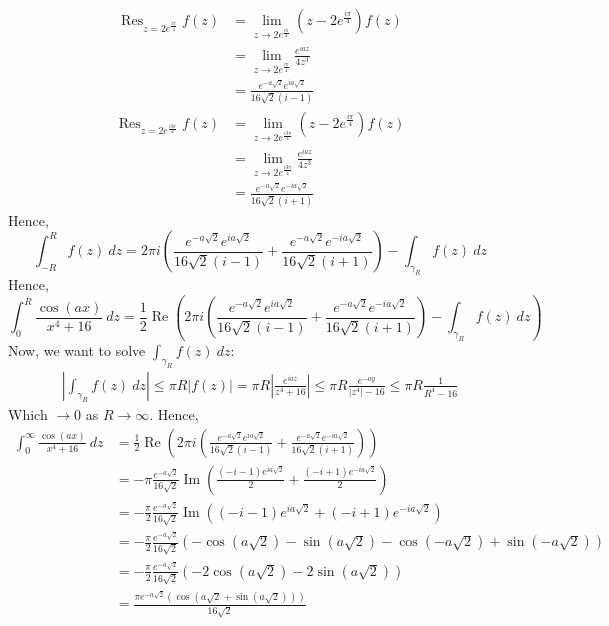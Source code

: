 \documentclass{article}
\newcommand{\abs}[1]{\left| #1 \right|}
\newcommand{\paren}[1]{\left(#1\right)}
\DeclareMathOperator{\real}{Re}
\DeclareMathOperator{\imm}{Im}
\DeclareMathOperator{\Res}{Res}
\begin{document}
\begin{enumerate}
\begin{align*}
\Res_{z=2e^{\frac{i\pi}{4}}} f(z) &= \lim_{z \to 2e^{\frac{i\pi}{4}}} (z-2e^{\frac{i\pi}{4}})f(z) \\
    &= \lim_{z \to 2e^{\frac{i\pi}{4}}} \frac{e^{iaz}}{4z^3} \\
    &= \frac{e^{-a\sqrt{2}}e^{ia\sqrt{2}}}{16\sqrt{2}(i-1)}
\end{align*}
\begin{align*}
\Res_{z=2e^{\frac{i3\pi}{4}}} f(z) &= \lim_{z \to 2e^{\frac{i3\pi}{4}}} (z-2e^{\frac{i\pi}{4}})f(z) \\
    &= \lim_{z \to 2e^{\frac{i3\pi}{4}}} \frac{e^{iaz}}{4z^3} \\
    &= \frac{e^{-a\sqrt{2}}e^{-ia\sqrt{2}}}{16\sqrt{2}(i+1)}
\end{align*}
Hence,
\[
\int_{-R}^R f(z)\ dz = 2\pi i\paren{\frac{e^{-a\sqrt{2}}e^{ia\sqrt{2}}}{16\sqrt{2}(i-1)} + \frac{e^{-a\sqrt{2}}e^{-ia\sqrt{2}}}{16\sqrt{2}(i+1)}} - \int_{\gamma_R} f(z)\ dz
\]
Hence,
\[
\int_{0}^R \frac{\cos (ax)}{x^4 + 16}\ dz = \frac{1}{2}\real \paren{2\pi i\paren{\frac{e^{-a\sqrt{2}}e^{ia\sqrt{2}}}{16\sqrt{2}(i-1)} + \frac{e^{-a\sqrt{2}}e^{-ia\sqrt{2}}}{16\sqrt{2}(i+1)}} - \int_{\gamma_R} f(z)\ dz}
\]
Now, we want to solve $\int_{\gamma_R} f(z)\ dz$:
\begin{align*}
\abs{\int_{\gamma_R} f(z)\ dz} \leq \pi R |f(z)| = \pi R \abs{\frac{e^{iaz}}{z^4 + 16}} \leq \pi R \frac{e^{-ay}}{|z^4| - 16} \leq \pi R \frac{1}{R^4 - 16}
\end{align*}
Which $\to 0$ as $R \to \infty$. Hence,
\begin{align*}
\int_{0}^\infty \frac{\cos (ax)}{x^4 + 16}\ dz &= \frac{1}{2}\real \paren{2\pi i\paren{\frac{e^{-a\sqrt{2}}e^{ia\sqrt{2}}}{16\sqrt{2}(i-1)} + \frac{e^{-a\sqrt{2}}e^{-ia\sqrt{2}}}{16\sqrt{2}(i+1)}}} \\
    &= -\pi \frac{e^{-a\sqrt{2}}}{16\sqrt{2}} \imm\paren{\frac{(-i-1)e^{ia\sqrt{2}}}{2} + \frac{(-i+1)e^{-ia\sqrt{2}}}{2}} \\
    &= -\frac{\pi}{2} \frac{e^{-a\sqrt{2}}}{16\sqrt{2}} \imm\paren{ (-i-1)e^{ia\sqrt{2}} + (-i+1)e^{-ia\sqrt{2}} } \\
    &= -\frac{\pi}{2} \frac{e^{-a\sqrt{2}}}{16\sqrt{2}} \paren{ -\cos(a\sqrt{2})  - \sin(a\sqrt{2}) - \cos(-a\sqrt{2}) + \sin(-a\sqrt{2})} \\
    &= -\frac{\pi}{2} \frac{e^{-a\sqrt{2}}}{16\sqrt{2}} \paren{ -2\cos(a\sqrt{2})  - 2\sin(a\sqrt{2})} \\
    &= \frac{\pi e^{-a\sqrt{2}}(\cos(a\sqrt{2} + \sin(a\sqrt{2})))}{16\sqrt{2}}
\end{align*}


\end{enumerate}
\end{document}
